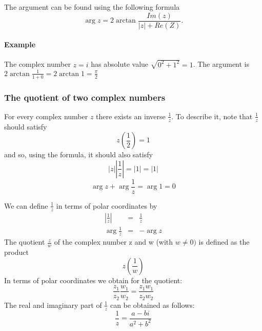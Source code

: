 \documentclass{article}
\begin{document}
			The argument can be found using the following formula
			\begin{equation*}
				\arg{z} = 2\arctan{\frac{Im(z)}{|z| + Re(Z)}}.
			\end{equation*}
			
			\paragraph{Example}
				The complex number $z = i$ has absolute value $\sqrt{0^2+1^2} = 1$. The argument is $2\arctan{\frac{1}{1 + 0}} = 2\arctan{1} = \frac{\pi}{2}$
			\subsubsection{The quotient of two complex numbers}
				For every complex number $z$ there exists an inverse $\frac{1}{z}$. To describe it, note that $\frac{1}{z}$ should satisfy
				\begin{equation*}
					z(\frac{1}{2}) = 1
				\end{equation*}
				and so, using the formula, it should also satisfy
				\begin{equation*}
					|z||\frac{1}{z}| = |1| = |1|
				\end{equation*}
				\begin{equation*}
					\arg{z} + \arg{\frac{1}{z}} = \arg{1} = 0
				\end{equation*}
				
				We can define $\frac{1}{z}$ in terms of polar coordinates by
				\begin{eqnarray*}
					|\frac{1}{z}| &=& \frac{1}{z} \\
					\arg{\frac{1}{z}} &=& -\arg{z}
				\end{eqnarray*}
				The quotient $\frac{z}{w}$ of the complex number z and w (with $w\neq0)$ is defined as the product
				\begin{equation*}
					z(\frac{1}{w})
				\end{equation*}
				In terms of polar coordinates we obtain for the quotient:
				\begin{equation*}
					\frac{z_1}{z_2}\frac{w_1}{w_2} = \frac{z_1w_1}{z_2w_2}
				\end{equation*}
				The real and imaginary part of $\frac{1}{z}$ can be obtained as follows:
				\begin{equation*}
					\frac{1}{z} = \frac{a-bi}{a^2+b^2}
				\end{equation*}
\end{document}
